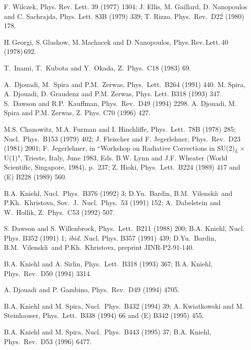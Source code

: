 \begin{thebibliography}{999}
 F. Wilczek, Phys. Rev. Lett. 39 (1977) 1304; 
J. Ellis, M. Gaillard, D. Nanopoulos and C. Sachrajda, Phys.
Lett. 83B (1979) 339; T. Rizzo, Phys.~Rev.~D22 (1980) 178.  

 H.\,Georgi, S.\,Glashow, M.\,Machacek and D.\,Nanopoulos,
Phys.\,Rev.\,Lett.\,40\,(1978)\,692.

 T.~Inami, T.~Kubota and Y.~Okada, Z.~Phys.~C18 (1983) 69.

 A.\ Djouadi, M.\ Spira and P.M.\ Zerwas, Phys.\ Lett.\ B264 
(1991) 440. 
%
 M. Spira, A. Djouadi, D. Graudenz and P.M. Zerwas,
Phys. Lett. B318 (1993) 347. 
%
%
 S.\ Dawson and R.P.\ Kauffman, Phys.\ Rev.\ D49 (1994) 2298.
%
 A. Djouadi, M. Spira and P.M. Zerwas, Z. Phys. C70 (1996) 427. 
%

 M.S. Chanowitz, M.A. Furman and I. Hinchliffe,
Phys.\ Lett.\ 78B (1978) 285; Nucl.\ Phys.\ B153 (1979) 402;
J. Fleischer and F. Jegerlehner, Phys.\ Rev.\ D23 (1981) 2001;
F. Jegerlehner, in ``Workshop on Radiative Corrections in
SU(2)${}_L\times{}$U(1)", Trieste, Italy, June 1983, Eds. 
B.W. Lynn and J.F. Wheater (World Scientific, Singapore, 1984), p.~237;
Z. Hioki, Phys.\ Lett.\ B224 (1989) 417 and (E) \ib B228 (1989) 560.

 B.A. Kniehl, Nucl.\ Phys.\ B376 (1992) 3; 
D.Yu.~Bardin, B.M.~Vilenski\u\i~and P.Kh.~Khristova,
Sov.~J.~Nucl.~Phys.~53 (1991) 152; 
A.~Dabelstein and W.~Hollik, Z.~Phys.~C53 (1992) 507.

 S. Dawson and S. Willenbrock, Phys.\ Lett.\ B211 (1988) 200;
B.A. Kniehl, Nucl. Phys. B352 (1991) 1; {\it ibid.} Nucl. Phys. B357 (1991) 
439; D.Yu.~Bardin, B.M.~Vilenski\u\i~and P.Kh.~Khristova, 
preprint JINR-P2-91-140.

 B.A. Kniehl and A. Sirlin, Phys.\ Lett.\ B318 (1993) 367;
B.A. Kniehl, Phys.\ Rev.\ D50 (1994) 3314.

 A. Djouadi and P. Gambino, Phys.\ Rev.\ D49 (1994) 4705.

 B.A. Kniehl and M. Spira, Nucl.\ Phys.\ B432 (1994) 39;
A. Kwiatkowski and M. Steinhauser, Phys.\ Lett.\ B338 (1994) 66 and (E)
B342 (1995) 455.

 B.A. Kniehl and M. Spira, Nucl.\ Phys.\ B443 (1995) 37;
B.A. Kniehl, Phys.\ Rev.\ D53 (1996) 6477.


\end{thebibliography}

